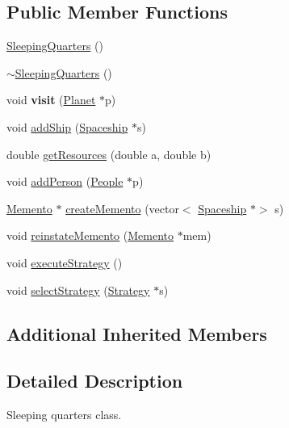 \subsection*{Public Member Functions}
\begin{DoxyCompactItemize}
\item 
\hyperlink{classSleepingQuarters_ab4055fa9d6ac27506b1577faec404fbb}{Sleeping\+Quarters} ()
\item 
\hyperlink{classSleepingQuarters_ad32e286540e322186993b15f5ebcffbc}{$\sim$\+Sleeping\+Quarters} ()
\item 
\mbox{\label{classSleepingQuarters_a586d57ac2ee057114d2d763890d863b9}} 
void {\bfseries visit} (\hyperlink{classPlanet}{Planet} $\ast$p)
\item 
void \hyperlink{classSleepingQuarters_ae15ba2bf6be5cc0d4580da9ecbbe28f5}{add\+Ship} (\hyperlink{classSpaceship}{Spaceship} $\ast$s)
\item 
double \hyperlink{classSleepingQuarters_aa1c2a40c05a566955965dee8118dc410}{get\+Resources} (double a, double b)
\item 
void \hyperlink{classSleepingQuarters_addd107a8005b61d51846e8e955922d50}{add\+Person} (\hyperlink{classPeople}{People} $\ast$p)
\item 
\hyperlink{classMemento}{Memento} $\ast$ \hyperlink{classSleepingQuarters_ac71f6fb8b3ec0be83be6cd3c080fecc0}{create\+Memento} (vector$<$ \hyperlink{classSpaceship}{Spaceship} $\ast$$>$ s)
\item 
void \hyperlink{classSleepingQuarters_a9a1fd96cb88a4eee245c7dda3672fac5}{reinstate\+Memento} (\hyperlink{classMemento}{Memento} $\ast$mem)
\item 
void \hyperlink{classSleepingQuarters_aa914af0350fa1a9ac5ebb7509d28b758}{execute\+Strategy} ()
\item 
void \hyperlink{classSleepingQuarters_a9a3c4618cd1a852984c0adba025c159f}{select\+Strategy} (\hyperlink{classStrategy}{Strategy} $\ast$s)
\end{DoxyCompactItemize}
\subsection*{Additional Inherited Members}


\subsection{Detailed Description}
Sleeping quarters class. 


